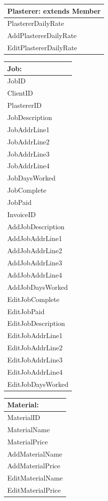 \begin{tabular}{|p{5cm}|}
	\hline
	\textbf{Plasterer:} extends \textbf{Member} \\ \hline
		PlastererDailyRate \\ \hline
		AddPlastererDailyRate \\
		EditPlastererDailyRate \\ \hline
\end{tabular}

\begin{tabular}{|p{5cm}|}
	\hline
	\textbf{Job:} \\ \hline
		JobID \\
		ClientID \\
		PlastererID \\
		JobDescription \\
		JobAddrLine1 \\
		JobAddrLine2 \\
		JobAddrLine3 \\
		JobAddrLine4 \\
		JobDaysWorked \\
		JobComplete \\
		JobPaid \\ 
		InvoiceID \\ \hline
		AddJobDescription\\
		AddJobAddrLine1 \\
		AddJobAddrLine2 \\
		AddJobAddrLine3 \\
		AddJobAddrLine4 \\
		AddJobDaysWorked \\
		EditJobComplete \\
		EditJobPaid \\
		EditJobDescription\\
		EditJobAddrLine1 \\
		EditJobAddrLine2 \\
		EditJobAddrLine3 \\
		EditJobAddrLine4 \\
		EditJobDaysWorked \\ \hline
\end{tabular}

\begin{tabular}{|p{5cm}|}
	\hline
	\textbf{Material:} \\ \hline
		MaterialID \\
		MaterialName \\
		MaterialPrice \\ \hline
		AddMaterialName\\
		AddMaterialPrice \\ \hline	
		EditMaterialName \\
		EditMaterialPrice \\ \hline
\end{tabular}


